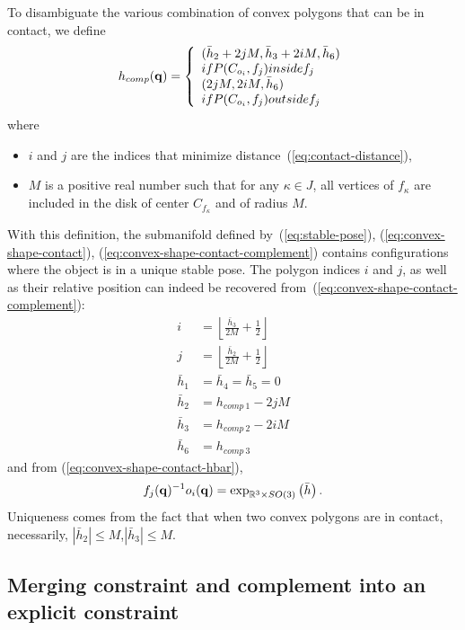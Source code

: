To disambiguate the various combination of convex polygons that can be in contact, we define
\begin{equation}\label{eq:convex-shape-contact-complement}
h_{comp}(\conf) = \left\{\begin{array}{l}(\bar{h}_2 + 2jM,\bar{h}_3 + 2iM,\bar{h}_6)\\
\mbox{if } P(C_{o_i},f_j)\mbox{ inside } f_j\\
(2jM,2iM,\bar{h}_6)\\
\mbox{if } P(C_{o_i},f_j)\mbox{ outside } f_j\end{array}\right.
\end{equation}
where
\begin{itemize}
\item $i$ and $j$ are the indices that minimize distance~(\ref{eq:contact-distance}),
\item $M$ is a positive real number such that for any $\kappa\in J$, all vertices of $f_\kappa$ are included in the disk of center $C_{f_\kappa}$ and of radius $M$.
\end{itemize}
With this definition, the submanifold defined by~(\ref{eq:stable-pose}), (\ref{eq:convex-shape-contact}), (\ref{eq:convex-shape-contact-complement}) contains configurations where the object is in a unique stable pose. The polygon indices $i$ and $j$, as well as their relative position can indeed be recovered from~(\ref{eq:convex-shape-contact-complement}):
\begin{align*}
  i &= \left\lfloor\frac{\bar{h}_3}{2M} + \frac{1}{2}\right\rfloor\\
  j &= \left\lfloor\frac{\bar{h}_2}{2M} + \frac{1}{2}\right\rfloor\\
  \bar{h}_1 &= \bar{h}_4 = \bar{h}_5 = 0\\
  \bar{h}_2 &= h_{comp\ 1} - 2jM\\
  \bar{h}_3 &= h_{comp\ 2} - 2iM\\
  \bar{h}_6 &= h_{comp\ 3}
\end{align*}
and from (\ref{eq:convex-shape-contact-hbar}),
$$
f_{j}(\mathbf{q})^{-1}o_i(\mathbf{q}) = \exp_{\mathbb{R}^3\times SO(3)}\left(\bar{h}\right).
$$
Uniqueness comes from the fact that when two convex polygons are in contact,
necessarily, $|\bar{h}_2| \leq M$,$|\bar{h}_3| \leq M$.

\subsection{Merging constraint and complement into an explicit constraint}
\label{subsec:explicit}

